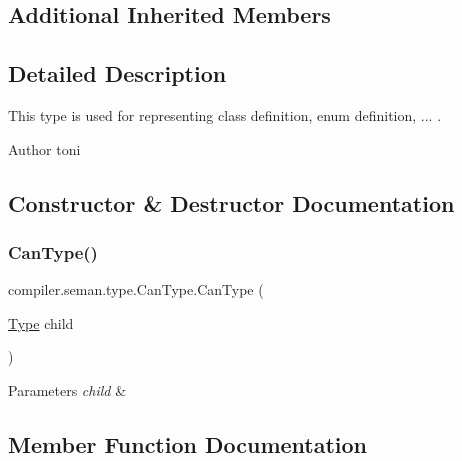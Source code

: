 \subsection*{Additional Inherited Members}


\subsection{Detailed Description}
This type is used for representing class definition, enum definition, ... . \begin{DoxyAuthor}{Author}
toni 
\end{DoxyAuthor}


\subsection{Constructor \& Destructor Documentation}
\mbox{\label{classcompiler_1_1seman_1_1type_1_1_can_type_ad1c422adb226e2fb73680f223b7aa943}} 
\subsubsection{\texorpdfstring{Can\+Type()}{CanType()}}
{\footnotesize\ttfamily compiler.\+seman.\+type.\+Can\+Type.\+Can\+Type (\begin{DoxyParamCaption}\item[{\hyperlink{classcompiler_1_1seman_1_1type_1_1_type}{Type}}]{child }\end{DoxyParamCaption})}


\begin{DoxyParams}{Parameters}
{\em child} & \\
\hline
\end{DoxyParams}


\subsection{Member Function Documentation}
\mbox{\label{classcompiler_1_1seman_1_1type_1_1_can_type_a6646fa82011755612c126f77badf7d3e}} 
